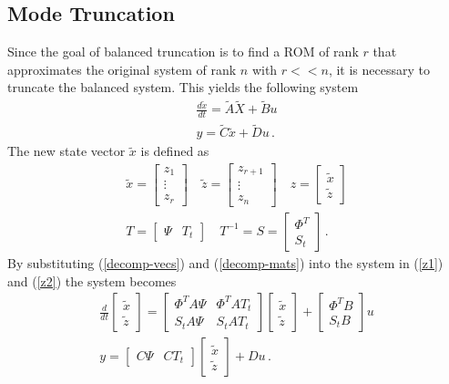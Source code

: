 \subsection{Mode Truncation}
Since the goal of balanced truncation is to find a ROM of rank \(r\) that approximates the original system of rank \(n\) with \(r << n\), it is necessary to truncate the balanced system.
This yields the following system
\begin{gather}
\frac{d\tilde{x}}{dt} = \tilde{A}\tilde{X} + \tilde{B}u \\
y = \tilde{C}\tilde{x} + \tilde{D}u  \,.
\end{gather}
The new state vector \(\tilde{x}\) is defined as
\begin{gather}
\tilde{x} = \begin{bmatrix}
z_1 \\
\vdots \\
z_r
\end{bmatrix} \quad 
\tilde{z} = \begin{bmatrix}
z_{r+1} \\
\vdots \\
z_n
\end{bmatrix} \quad
z = \begin{bmatrix}
\tilde{x} \\
\tilde{z}
\end{bmatrix} \label{decomp-vecs}\\
T = \begin{bmatrix}
\Psi & T_t
\end{bmatrix} \quad
T^{-1} = S = \begin{bmatrix}
\Phi^{T} \\
S_t
\end{bmatrix}  \,. \label{decomp-mats}
\end{gather}
By substituting (\ref{decomp-vecs}) and (\ref{decomp-mats}) into the system in (\ref{z1}) and (\ref{z2}) the system becomes
\begin{gather}
\frac{d}{dt} \begin{bmatrix}
\tilde{x} \\
\tilde{z}
\end{bmatrix} = \begin{bmatrix}
\Phi^{T}A\Psi & \Phi^{T}AT_t \\
S_tA\Psi & S_tAT_t
\end{bmatrix} \begin{bmatrix}
\tilde{x} \\
\tilde{z}
\end{bmatrix}
+ \begin{bmatrix}
\Phi^{T}B \\
S_tB
\end{bmatrix} u \\
y = \begin{bmatrix}
C \Psi & CT_t
\end{bmatrix} \begin{bmatrix}
\tilde{x} \\
\tilde{z}
\end{bmatrix} + Du
 \,.
\end{gather}
